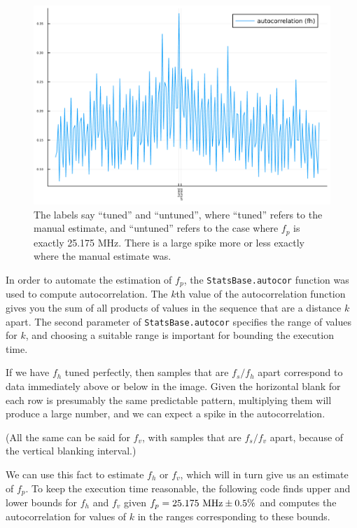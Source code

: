 \documentclass{article}
\newcommand*{\code}[1]{\texttt{#1}}
\begin{document}
\begin{figure}
    \centering
    \includegraphics[width=\linewidth]{images/autocor_fh.png}
    \caption{The labels say ``tuned'' and ``untuned'', where ``tuned'' refers to the manual estimate, and ``untuned'' refers to the case where $f_p$ is exactly 25.175 MHz. There is a large spike more or less exactly where the manual estimate was.}
    \label{fig:autocorrelation-fh}
\end{figure}

In order to automate the estimation of $f_p$, the \code{StatsBase.autocor} function was used to compute autocorrelation. The $k$th value of the autocorrelation function gives you the sum of all products of values in the sequence that are a distance $k$ apart. The second parameter of \code{StatsBase.autocor} specifies the range of values for $k$, and choosing a suitable range is important for bounding the execution time.

If we have $f_h$ tuned perfectly, then samples that are $f_s/f_h$ apart correspond to data immediately above or below in the image. Given the horizontal blank for each row is presumably the same predictable pattern, multiplying them will produce a large number, and we can expect a spike in the autocorrelation.

(All the same can be said for $f_v$, with samples that are $f_s/f_v$ apart, because of the vertical blanking interval.)

We can use this fact to estimate $f_h$ or $f_v$, which will in turn give us an estimate of $f_p$. To keep the execution time reasonable, the following code finds upper and lower bounds for $f_h$ and $f_v$ given $f_p = \textnormal{25.175 MHz} \pm \textnormal{0.5\%}$ and computes the autocorrelation for values of $k$ in the ranges corresponding to these bounds.
\end{document}
